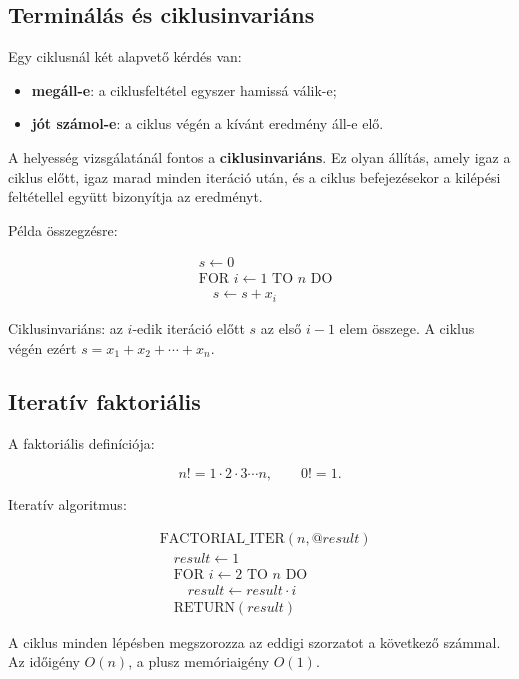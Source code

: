 \subsection{Terminálás és ciklusinvariáns}

Egy ciklusnál két alapvető kérdés van:

\begin{itemize}
  \item \textbf{megáll-e}: a ciklusfeltétel egyszer hamissá válik-e;
  \item \textbf{jót számol-e}: a ciklus végén a kívánt eredmény áll-e elő.
\end{itemize}

A helyesség vizsgálatánál fontos a \textbf{ciklusinvariáns}. Ez olyan állítás, amely igaz a ciklus előtt, igaz marad minden iteráció után, és a ciklus befejezésekor a kilépési feltétellel együtt bizonyítja az eredményt.

Példa összegzésre:

\[
\begin{aligned}
&s\leftarrow 0\\
&\text{FOR } i\leftarrow 1 \text{ TO } n \text{ DO}\\
&\quad s\leftarrow s+x_i
\end{aligned}
\]

Ciklusinvariáns: az $i$-edik iteráció előtt $s$ az első $i-1$ elem összege. A ciklus végén ezért $s=x_1+x_2+\cdots+x_n$.

\subsection{Iteratív faktoriális}

A faktoriális definíciója:

\[
n!=1\cdot2\cdot3\cdots n,\qquad 0!=1.
\]

Iteratív algoritmus:

\[
\begin{aligned}
&\text{FACTORIAL\_ITER}(n,@result)\\
&\quad result\leftarrow 1\\
&\quad \text{FOR } i\leftarrow 2 \text{ TO } n \text{ DO}\\
&\quad\quad result\leftarrow result\cdot i\\
&\quad \text{RETURN}(result)
\end{aligned}
\]

A ciklus minden lépésben megszorozza az eddigi szorzatot a következő számmal. Az időigény $O(n)$, a plusz memóriaigény $O(1)$.

